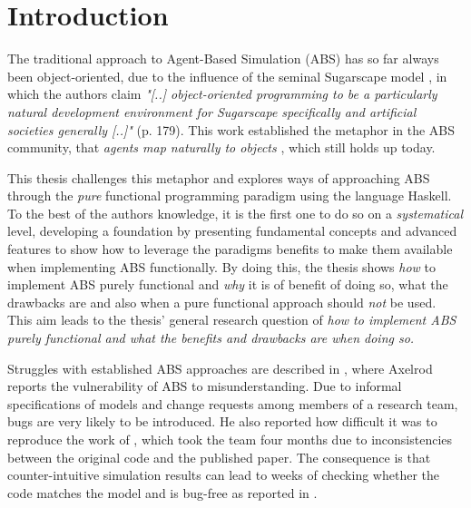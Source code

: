 \chapter{Introduction}
\label{ch:intro}

The traditional approach to Agent-Based Simulation (ABS) has so far always been object-oriented, due to the influence of the seminal Sugarscape model \cite{epstein_growing_1996}, in which the authors claim \textit{"[..] object-oriented programming to be a particularly natural development environment for Sugarscape specifically and artificial societies generally [..]"} (p. 179). This work established the metaphor in the ABS community, that \textit{agents map naturally to objects} \cite{north_managing_2007}, which still holds up today. %

This thesis challenges this metaphor and explores ways of approaching ABS through the \textit{pure} functional programming paradigm using the language Haskell. To the best of the authors knowledge, it is the first one to do so on a \textit{systematical} level, developing a foundation by presenting fundamental concepts and advanced features to show how to leverage the paradigms benefits \cite{hudak_history_2007} to make them available when implementing ABS functionally. By doing this, the thesis shows \textit{how} to implement ABS purely functional and \textit{why} it is of benefit of doing so, what the drawbacks are and also when a pure functional approach should \textit{not} be used. This aim leads to the thesis' general research question of \textit{how to implement ABS purely functional and what the benefits and drawbacks are when doing so.} 

\medskip

Struggles with established ABS approaches are described in \cite{axelrod_chapter_2006}, where Axelrod reports the vulnerability of ABS to misunderstanding. Due to informal specifications of models and change requests among members of a research team, bugs are very likely to be introduced. He also reported how difficult it was to reproduce the work of \cite{axelrod_convergence_1995}, which took the team four months due to inconsistencies between the original code and the published paper. The consequence is that counter-intuitive simulation results can lead to weeks of checking whether the code matches the model and is bug-free as reported in \cite{axelrod_advancing_1997}.

